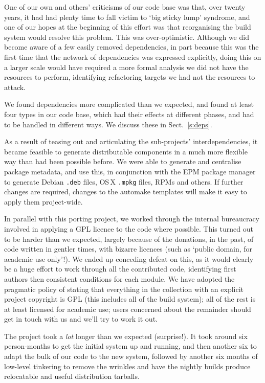 \documentclass{speauth}
\begin{document}
One of our own and others' criticisms of our code base was that, over
twenty years, it had had plenty time to fall victim to `big sticky
lump' syndrome, and one of our hopes at the beginning of this effort
was that reorganising the build system would resolve this problem.
This was over-optimistic.  Although we did become aware of a few
easily removed dependencies, in part because this was the first time
that the network of dependencies was expressed explicitly, doing this
on a larger scale would have required a more formal analysis we did
not have the resources to perform, identifying refactoring targets we
had not the resources to attack.

We found dependencies more complicated than we expected, and found at
least four types in our code base, which had their effects at
different phases, and had to be handled in different ways.  We discuss
these in Sect.~\ref{s:deps}.

As a result of teasing out and articulating the sub-projects'
interdependencies, it became feasible to generate distributable
components in a much more flexible way than had been possible before.
We were able to generate and centralise package metadata, and use
this, in conjunction with the EPM package manager~\cite{epm} to
generate Debian \texttt{.deb} files, OS\,X \texttt{.mpkg} files, RPMs
and others.  If further changes are required, changes to the automake
templates will make it easy to apply them project-wide.

In parallel with this porting project, we worked through the internal
bureaucracy involved in applying a GPL licence to the code where
possible.  This turned out to be harder than we expected, largely
because of the donations, in the past, of code written in gentler
times, with bizarre licences (such as `public domain, for academic use
only'!).  We ended up conceding defeat on this, as it would clearly be
a huge effort to work through all the contributed code, identifying
first authors then consistent conditions for each module.  We have
adopted the pragmatic policy of stating that everything in the
collection with an explicit project copyright is GPL (this includes
all of the build system); all of the rest is at least licensed for
academic use; users concerned about the remainder should get in touch
with us and we'll try to work it out.

The project took a \emph{lot} longer than we expected (surprise!).  It
took around six person-months to get the initial system up and
running, and then another six to adapt the bulk of our code to the new
system, followed by another six months of low-level tinkering to
remove the wrinkles and have the nightly builds produce relocatable
and useful distribution tarballs.
\end{document}
